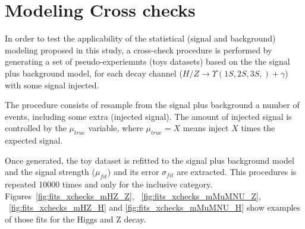 \clearpage
\section{Modeling Cross checks} \label{modeling_xchecks}

In order to test the applicability of the statistical (signal and background) modeling proposed in this study, a cross-check procedure is performed by generating a set of pseudo-experiemnts (toys datasets) based on the  the signal plus background model, for each decay channel ($H/Z \rightarrow \Upsilon(1S,2S,3S,)+\gamma$) with some signal injected.

The procedure consists of resample from the signal plus background a number of events, including some extra (injected signal). The amount of injected signal is controlled by the $\mu_{true}$ variable, where $\mu_{true} = X$ means inject $X$ times the expected signal.

Once generated, the toy dataset is refitted to the signal plus background model and the signal strength ($\mu_{fit}$) and its error $\sigma_{fit}$ are extracted. This procedures is repeated 10000 times and only for the inclusive category. Figures~\ref{fig:fits_xchecks_mHZ_Z}, ~\ref{fig:fits_xchecks_mMuMNU_Z}, ~\ref{fig:fits_xchecks_mHZ_H} and \ref{fig:fits_xchecks_mMuMNU_H} show examples of those fits for the Higgs and Z decay.


